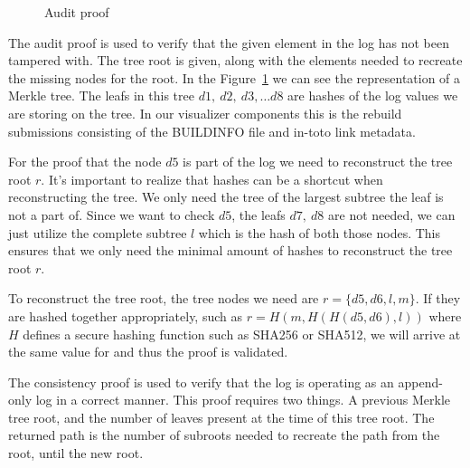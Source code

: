 \documentclass[../Main/thesis.tex]{subfiles}
\begin{document}
\begin{figure}[H]
\centering
{}%
\qquad
{}%
\caption{Audit proof}
\label{fig:audit}
\end{figure}

The audit proof is used to verify that the given element in the log has not been
tampered with. The tree root is given, along with the elements needed to
recreate the missing nodes for the root. In the Figure~\ref{fig:audit} we can
see the representation of a Merkle tree. The leafs in this tree $ d1,\ d2,\ d3,
\ldots d8 $ are hashes of the log values we are storing on the tree. In our
visualizer components this is the rebuild submissions consisting of the
BUILDINFO file and in-toto link metadata.

For the proof that the node $ d5 $ is part of the log we need to reconstruct the
tree root $ r $. It's important to realize that hashes can be a shortcut when
reconstructing the tree. We only need the tree of the largest subtree the leaf
is not a part of. Since we want to check $ d5 $, the leafs ${d7,\ d8}$ are not
needed, we can just utilize the complete subtree $ l $ which is the hash of both
those nodes. This ensures that we only need the minimal amount of hashes to
reconstruct the tree root $ r $.

To reconstruct the tree root, the tree nodes we need are $ r = \{ d5, d6, l, m
\} $.  If they are hashed together appropriately, such as $ r = H( m, H( H(d5,
d6), l)) $ where $ H $ defines a secure hashing function such as SHA256 or
SHA512, we will arrive at the same value for and thus the proof is validated.

The consistency proof is used to verify that the log is operating as an
append-only log in a correct manner. This proof requires two things. A
previous Merkle tree root, and the number of leaves present at the time of
this tree root. The returned path is the number of subroots needed to
recreate the path from the root, until the new root.
\end{document}
